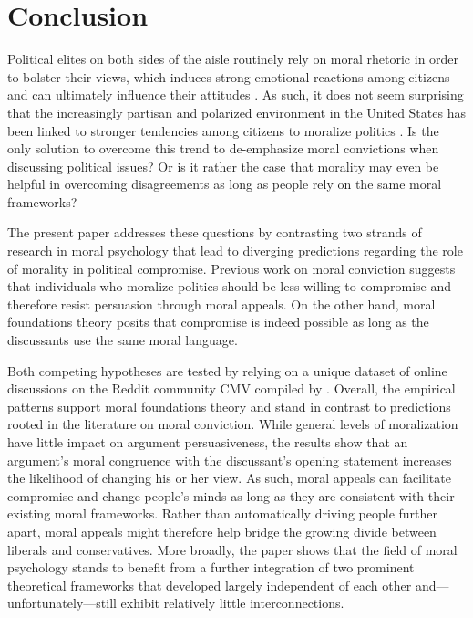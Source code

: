 \section{Conclusion}\label{conclusion}

Political elites on both sides of the aisle routinely rely on moral rhetoric in order to bolster their views, which induces strong emotional reactions among citizens \citep{lipsitz2017playing} and can ultimately influence their attitudes \citep[e.g.,][]{clifford2013words,clifford2015concerns}. As such, it does not seem surprising that the increasingly partisan and polarized environment in the United States has been linked to stronger tendencies among citizens to moralize politics \citep{garrett2018moral}. Is the only solution to overcome this trend to de-emphasize moral convictions when discussing political issues? Or is it rather the case that morality may even be helpful in overcoming disagreements as long as people rely on the same moral frameworks?

The present paper addresses these questions by contrasting two strands of research in moral psychology that lead to diverging predictions regarding the role of morality in political compromise. Previous work on moral conviction suggests that individuals who moralize politics should be less willing to compromise and therefore resist persuasion through moral appeals. On the other hand, moral foundations theory posits that compromise is indeed possible as long as the discussants use the same moral language.

Both competing hypotheses are tested by relying on a unique dataset of online discussions on the Reddit community CMV compiled by \cite{tan2016winning}. Overall, the empirical patterns support moral foundations theory and stand in contrast to predictions rooted in the literature on moral conviction. While general levels of moralization have little impact on argument persuasiveness, the results show that an argument's moral congruence with the discussant's opening statement increases the likelihood of changing his or her view. As such, moral appeals can facilitate compromise and change people's minds as long as they are consistent with their existing moral frameworks. Rather than automatically driving people further apart, moral appeals might therefore help bridge the growing divide between liberals and conservatives. More broadly, the paper shows that the field of moral psychology stands to benefit from a further integration of two prominent theoretical frameworks that developed largely independent of each other and---unfortunately---still exhibit relatively little interconnections.

